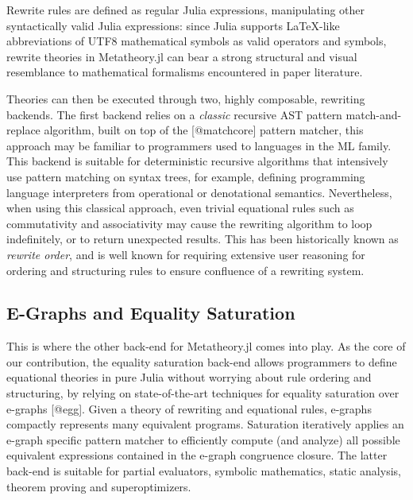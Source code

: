 \documentclass[
]{article}
\begin{document}
Rewrite rules are defined as regular Julia expressions, manipulating
other syntactically valid Julia expressions: since Julia supports
LaTeX-like abbreviations of UTF8 mathematical symbols as valid operators
and symbols, rewrite theories in Metatheory.jl can bear a strong
structural and visual resemblance to mathematical formalisms encountered
in paper literature.

Theories can then be executed through two, highly composable, rewriting
backends. The first backend relies on a \emph{classic} recursive AST
pattern match-and-replace algorithm, built on top of the
{[}@matchcore{]} pattern matcher, this approach may be familiar to
programmers used to languages in the ML family. This backend is suitable
for deterministic recursive algorithms that intensively use pattern
matching on syntax trees, for example, defining programming language
interpreters from operational or denotational semantics. Nevertheless,
when using this classical approach, even trivial equational rules such
as commutativity and associativity may cause the rewriting algorithm to
loop indefinitely, or to return unexpected results. This has been
historically known as \emph{rewrite order}, and is well known for
requiring extensive user reasoning for ordering and structuring rules to
ensure confluence of a rewriting system.

\hypertarget{e-graphs-and-equality-saturation}{%
\subsection{E-Graphs and Equality
Saturation}\label{e-graphs-and-equality-saturation}}

This is where the other back-end for Metatheory.jl comes into play. As
the core of our contribution, the equality saturation back-end allows
programmers to define equational theories in pure Julia without worrying
about rule ordering and structuring, by relying on state-of-the-art
techniques for equality saturation over e-graphs {[}@egg{]}. Given a
theory of rewriting and equational rules, e-graphs compactly represents
many equivalent programs. Saturation iteratively applies an e-graph
specific pattern matcher to efficiently compute (and analyze) all
possible equivalent expressions contained in the e-graph congruence
closure. The latter back-end is suitable for partial evaluators,
symbolic mathematics, static analysis, theorem proving and
superoptimizers.
\end{document}

